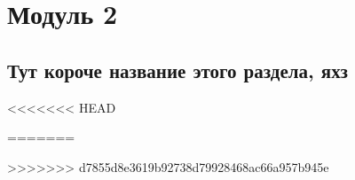 \section{Модуль 2}
\subsection{Тут короче название этого раздела, яхз}



<<<<<<< HEAD

=======










>>>>>>> d7855d8e3619b92738d79928468ac66a957b945e



\pagebreak
